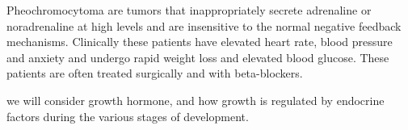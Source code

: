 \documentclass{tufte-handout}
\begin{document}
  Pheochromocytoma are tumors that inappropriately secrete adrenaline or noradrenaline at high levels and are insensitive to the normal negative feedback mechanisms.  Clinically these patients have elevated heart rate, blood pressure and anxiety and undergo rapid weight loss and elevated blood glucose.  These patients are often treated surgically and with beta-blockers.

 we will consider growth hormone, and how growth is regulated by endocrine factors during the various stages of development.
\listoffigures
\listoftables



\end{document}
